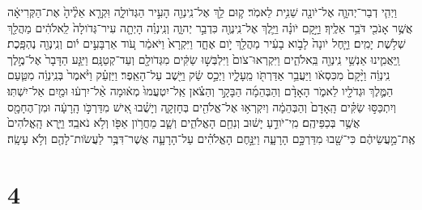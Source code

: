 \documentclass{openreader}
\begin{document}
וַיְהִ֧י דְבַר־יְהוָ֛ה אֶל־יֹונָ֖ה שֵׁנִ֥ית לֵאמֹֽר׃ ק֛וּם לֵ֥ךְ אֶל־נִֽינְוֵ֖ה הָעִ֣יר הַגְּדֹולָ֑ה וִּקְרָ֤א אֵלֶ֨יהָ֙ אֶת־הַקְּרִיאָ֔ה אֲשֶׁ֥ר אָנֹכִ֖י דֹּבֵ֥ר אֵלֶֽיךָ׃ וַיָּ֣קָם יֹונָ֗ה וַיֵּ֛לֶךְ אֶל־נִֽינְוֶ֖ה כִּדְבַ֣ר יְהוָ֑ה וְנִֽינְוֵ֗ה הָיְתָ֤ה עִיר־גְּדֹולָה֙ לֵֽאלֹהִ֔ים מַהֲלַ֖ךְ שְׁלֹ֥שֶׁת יָמִֽים׃ וַיָּ֤חֶל יֹונָה֙ לָבֹ֣וא בָעִ֔יר מַהֲלַ֖ךְ יֹ֣ום אֶחָ֑ד וַיִּקְרָא֙ וַיֹּאמַ֔ר עֹ֚וד אַרְבָּעִ֣ים יֹ֔ום וְנִֽינְוֵ֖ה נֶהְפָּֽכֶת׃ וַֽיַּאֲמִ֛ינוּ אַנְשֵׁ֥י נִֽינְוֵ֖ה בֵּֽאלֹהִ֑ים וַיִּקְרְאוּ־צֹום֙ וַיִּלְבְּשׁ֣וּ שַׂקִּ֔ים מִגְּדֹולָ֖ם וְעַד־קְטַנָּֽם׃ וַיִּגַּ֤ע הַדָּבָר֙ אֶל־מֶ֣לֶך נִֽינְוֵ֔ה וַיָּ֨קָם֙ מִכִּסְאֹ֔ו וַיַּעֲבֵ֥ר אַדַּרְתֹּ֖ו מֵֽעָלָ֑יו וַיְכַ֣ס שַׂ֔ק וַיֵּ֖שֶׁב עַל־הָאֵֽפֶר׃ וַיַּזְעֵ֗ק וַיֹּ֨אמֶר֙ בְּנִֽינְוֵ֔ה מִטַּ֧עַם הַמֶּ֛לֶךְ וּגְדֹלָ֖יו לֵאמֹ֑ר הָאָדָ֨ם וְהַבְּהֵמָ֜ה הַבָּקָ֣ר וְהַצֹּ֗אן אַֽל־יִטְעֲמוּ֙ מְא֔וּמָה אַ֨ל־יִרְע֔וּ וּמַ֖יִם אַל־יִשְׁתּֽוּ׃ וְיִתְכַּסּ֣וּ שַׂקִּ֗ים הָֽאָדָם֙ וְהַבְּהֵמָ֔ה וְיִקְרְא֥וּ אֶל־אֱלֹהִ֖ים בְּחָזְקָ֑ה וְיָשֻׁ֗בוּ אִ֚ישׁ מִדַּרְכֹּ֣ו הָֽרָעָ֔ה וּמִן־הֶחָמָ֖ס אֲשֶׁ֥ר בְּכַפֵּיהֶֽם׃ מִֽי־יֹודֵ֣עַ יָשׁ֔וּב וְנִחַ֖ם הָאֱלֹהִ֑ים וְשָׁ֛ב מֵחֲרֹ֥ון אַפֹּ֖ו וְלֹ֥א נֹאבֵֽד׃ וַיַּ֤רְא הָֽאֱלֹהִים֙ אֶֽת־מַ֣עֲשֵׂיהֶ֔ם כִּי־שָׁ֖בוּ מִדַּרְכָּ֣ם הָרָעָ֑ה וַיִּנָּ֣חֶם הָאֱלֹהִ֗ים עַל־הָרָעָ֛ה אֲשֶׁר־דִּבֶּ֥ר לַעֲשֹׂות־לָהֶ֖ם וְלֹ֥א עָשָֽׂה׃ \section*{4}
\end{document}

